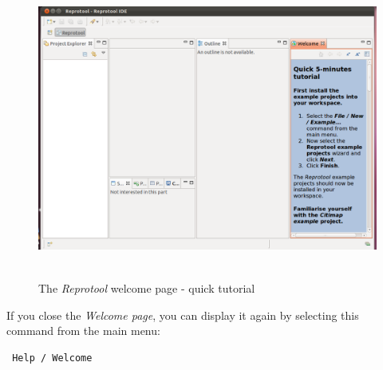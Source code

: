 \begin{figure}[ht]
  \centering
  \includegraphics[height=280pt]{images/reprotoolWelcomeTutorial}
  \caption{The \emph{Reprotool} welcome page - quick tutorial}
  \label{fig:reprotoolWelcomeTutorial}
\end{figure}

If you close the \emph{Welcome page}, you can display it again by selecting this command from the main menu:
\begin{verbatim}
 Help / Welcome
\end{verbatim}
